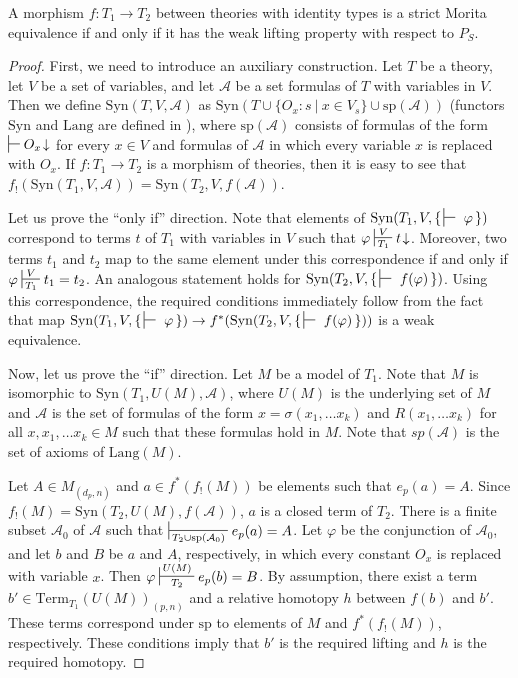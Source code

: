 \documentclass[reqno]{amsart}
\theoremstyle{definition}
\theoremstyle{remark}
\newcommand{\Syn}{\mathrm{Syn}}
\newcommand{\Lang}{\mathrm{Lang}}
\newcommand{\Term}{\mathrm{Term}}
\numberwithin{figure}{section}
\begin{document}
\begin{prop}
A morphism $f : T_1 \to T_2$ between theories with identity types is a strict Morita equivalence if and only if it has the weak lifting property with respect to $P_S$.
\end{prop}
\begin{proof}
First, we need to introduce an auxiliary construction.
Let $T$ be a theory, let $V$ be a set of variables, and let $\mathcal{A}$ be a set formulas of $T$ with variables in $V$.
Then we define $\Syn(T,V,\mathcal{A})$ as $\Syn(T \cup \{ O_x : s\ |\ x \in V_s \} \cup \mathrm{sp}(\mathcal{A}))$ (functors $\Syn$ and $\Lang$ are defined in \cite{alg-models}),
where $\mathrm{sp}(\mathcal{A})$ consists of formulas of the form $\sststile{}{} O_x\!\downarrow$ for every $x \in V$
and formulas of $\mathcal{A}$ in which every variable $x$ is replaced with $O_x$.
If $f : T_1 \to T_2$ is a morphism of theories, then it is easy to see that $f_!(\Syn(T_1,V,\mathcal{A})) = \Syn(T_2,V,f(\mathcal{A}))$.

Let us prove the ``only if'' direction.
Note that elements of $\Syn(T_1, V, \{\,\sststile{}{}~\varphi\,\})$ correspond to terms $t$ of $T_1$ with variables in $V$ such that $\varphi \sststile{T_1}{V} t\!\downarrow$.
Moreover, two terms $t_1$ and $t_2$ map to the same element under this correspondence if and only if $\varphi \sststile{T_1}{V} t_1 = t_2$.
An analogous statement holds for $\Syn(T_2, V, \{\,\sststile{}{}~f(\varphi)\,\})$.
Using this correspondence, the required conditions immediately follow from the fact that
map $\Syn(T_1, V, \{\,\sststile{}{}~\varphi\,\}) \to f^*(\Syn(T_2, V, \{\,\sststile{}{}~f(\varphi)\,\}))$ is a weak equivalence.

Now, let us prove the ``if'' direction.
Let $M$ be a model of $T_1$.
Note that $M$ is isomorphic to $\Syn(T_1, U(M), \mathcal{A})$, where $U(M)$ is the underlying set of $M$ and $\mathcal{A}$ is the set of formulas of the form
$x = \sigma(x_1, \ldots x_k)$ and $R(x_1, \ldots x_k)$ for all $x, x_1, \ldots x_k \in M$ such that these formulas hold in $M$.
Note that $sp(\mathcal{A})$ is the set of axioms of $\Lang(M)$.

Let $A \in M_{(d_p,n)}$ and $a \in f^*(f_!(M))$ be elements such that $e_p(a) = A$.
Since $f_!(M) = \Syn(T_2, U(M), f(\mathcal{A}))$, $a$ is a closed term of $T_2$.
There is a finite subset $\mathcal{A}_0$ of $\mathcal{A}$ such that $\sststile{T_2 \cup \mathrm{sp}(\mathcal{A}_0)}{} e_p(a) = A$.
Let $\varphi$ be the conjunction of $\mathcal{A}_0$, and let $b$ and $B$ be $a$ and $A$, respectively, in which every constant $O_x$ is replaced with variable $x$.
Then $\varphi \sststile{T_2}{U(M)} e_p(b) = B$.
By assumption, there exist a term $b' \in \Term_{T_1}(U(M))_{(p,n)}$ and a relative homotopy $h$ between $f(b)$ and $b'$.
These terms correspond under $\mathrm{sp}$ to elements of $M$ and $f^*(f_!(M))$, respectively.
These conditions imply that $b'$ is the required lifting and $h$ is the required homotopy.
\end{proof}
\end{document}
